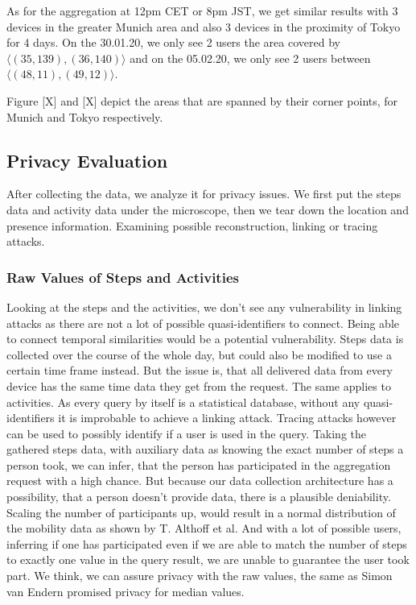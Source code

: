 As for the aggregation at 12pm CET or 8pm JST, we get similar results with 3 devices in the greater Munich area and also 3 devices in the proximity of Tokyo for 4 days. On the 30.01.20, we only see 2 users the area covered by \(\langle(35, 139),(36, 140)\rangle\) and on the 05.02.20, we only see 2 users between \(\langle(48, 11),(49, 12)\rangle\).

Figure [X] and [X] depict the areas that are spanned by their corner points, for Munich and Tokyo respectively. 


\subsection{Privacy Evaluation}
After collecting the data, we analyze it for privacy issues. We first put the steps data and activity data under the microscope, then we tear down the location and presence information. Examining possible reconstruction, linking or tracing attacks.

\subsubsection{Raw Values of Steps and Activities}
Looking at the steps and the activities, we don't see any vulnerability in linking attacks as there are not a lot of possible quasi-identifiers to connect. Being able to connect temporal similarities would be a potential vulnerability. Steps data is collected over the course of the whole day, but could also be modified to use a certain time frame instead. But the issue is, that all delivered data from every device has the same time data they get from the request. The same applies to activities. As every query by itself is a statistical database, without any quasi-identifiers it is improbable to achieve a linking attack. 
Tracing attacks however can be used to possibly identify if a user is used in the query. Taking the gathered steps data, with auxiliary data as knowing the exact number of steps a person took, we can infer, that the person has participated in the aggregation request with a high chance. But because our data collection architecture has a possibility, that a person doesn't provide data, there is a plausible deniability. Scaling the number of participants up, would result in a normal distribution of the mobility data as shown by T. Althoff et al. And with a lot of possible users, inferring if one has participated even if we are able to match the number of steps to exactly one value in the query result, we are unable to guarantee the user took part. We think, we can assure privacy with the raw values, the same as Simon van Endern promised privacy for median values.

